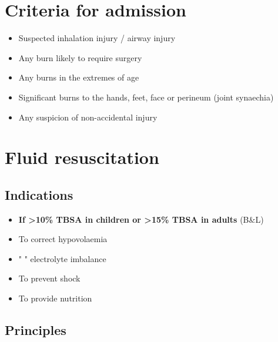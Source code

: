 \documentclass[
  14pt,
]{memoir}
\providecommand{\tightlist}{%
  \setlength{\itemsep}{0pt}\setlength{\parskip}{0pt}}
\begin{document}
\hypertarget{criteria-for-admission}{%
\section{Criteria for admission}\label{criteria-for-admission}}

\begin{itemize}
\tightlist
\item
  Suspected inhalation injury / airway injury
\item
  Any burn likely to require surgery
\item
  Any burns in the extremes of age
\item
  Significant burns to the hands, feet, face or perineum (joint
  synaechia)
\item
  Any suspicion of non-accidental injury
\end{itemize}

\hypertarget{fluid-resuscitation}{%
\section{Fluid resuscitation}\label{fluid-resuscitation}}

\hypertarget{indications-1}{%
\subsection{Indications}\label{indications-1}}

\begin{itemize}
\tightlist
\item
  \textbf{If \textgreater10\% TBSA in children or \textgreater15\% TBSA
  in adults} (B\&L)
\item
  To correct hypovolaemia
\item
  " " electrolyte imbalance
\item
  To prevent shock
\item
  To provide nutrition
\end{itemize}

\hypertarget{principles}{%
\subsection{Principles}\label{principles}}
\end{document}
